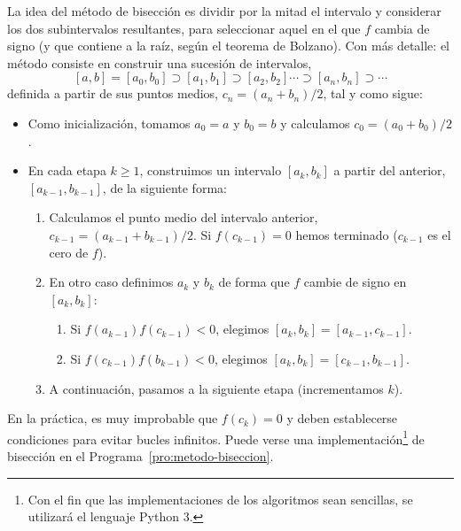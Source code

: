 La idea del método de bisección es dividir por la mitad el intervalo y
considerar los dos subintervalos resultantes, para seleccionar aquel
en el que $f$ cambia de signo (y que contiene a la raíz, según el
teorema de Bolzano). Con más detalle: el método consiste en construir
una sucesión de intervalos,
\begin{equation}
  \label{eq:tema1:bisecc:0}
  [a,b]=[a_0,b_0] \supset [a_1,b_1] \supset [a_2,b_2] \cdots \supset
  [a_n,b_n] \supset \cdots
\end{equation}
definida a partir de sus puntos medios, $c_n=(a_n+b_n)/2$, tal y como sigue:
\begin{itemize}
\item Como inicialización, tomamos $a_0=a$ y $b_0=b$ y calculamos
  $c_0=(a_0+b_0)/2$.
\item En cada etapa $k\ge 1$, construimos un intervalo $[a_k,b_k]$ a
  partir del anterior, $[a_{k-1}, b_{k-1}]$, de la siguiente forma:
  \begin{enumerate}
  \item Calculamos el punto medio del intervalo anterior,
    $c_{k-1}=(a_{k-1}+b_{k-1})/2$. Si $f(c_{k-1})=0$ hemos terminado
    ($c_{k-1}$ es el cero de $f$).
  \item En otro caso definimos $a_k$ y $b_k$ de forma que $f$ cambie de
    signo en $[a_k,b_k]$:
    \begin{enumerate}
    \item Si $f(a_{k-1})f(c_{k-1})<0$, elegimos $[a_k,b_k]=[a_{k-1}, c_{k-1}]$.
    \item Si $f(c_{k-1})f(b_{k-1})<0$, elegimos $[a_k,b_k]=[c_{k-1}, b_{k-1}]$.
    \end{enumerate}
  \item A continuación, pasamos a la siguiente etapa (incrementamos
    $k$).
  \end{enumerate}
\end{itemize}

En la práctica, es muy improbable que $f(c_k)=0$ y deben establecerse
condiciones para evitar bucles infinitos. Puede verse una
implementación\footnote{Con el fin que las
  implementaciones de los algoritmos sean sencillas, se utilizará el
  lenguaje Python 3.} de bisección en el
Programa~\ref{pro:metodo-biseccion}.

